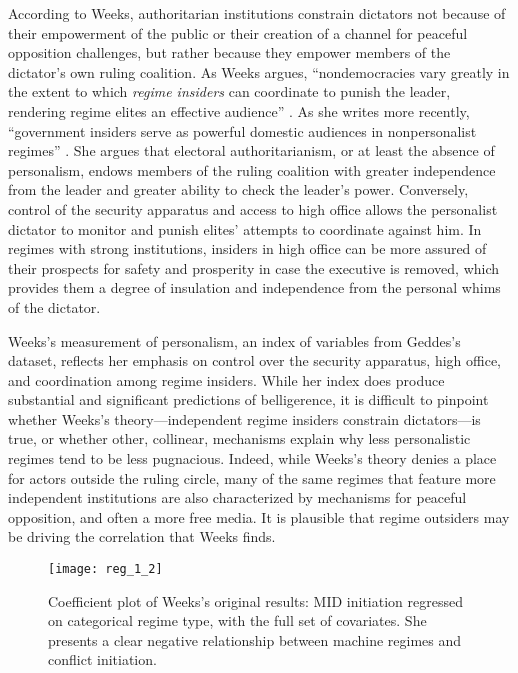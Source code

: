 \documentclass[12pt]{article}
\begin{document}
\par According to Weeks, authoritarian institutions constrain dictators not because of their empowerment of the public or their creation of a channel for peaceful opposition challenges, but rather because they empower members of the dictator's own ruling coalition. As Weeks argues, \enquote{nondemocracies vary greatly in the extent to which \textit{regime insiders} can coordinate to punish the leader, rendering regime elites an effective audience} \parencite*[40, emphasis in original]{weeks:2008}. As she writes more recently, \enquote{government insiders serve as powerful domestic audiences in nonpersonalist regimes} \parencite[330]{weeks:2012}. She argues that electoral authoritarianism, or at least the absence of personalism, endows members of the ruling coalition with greater independence from the leader and greater ability to check the leader's power. Conversely, control of the security apparatus and access to high office allows the personalist dictator to monitor and punish elites' attempts to coordinate against him. In regimes with strong institutions, insiders in high office can be more assured of their prospects for safety and prosperity in case the executive is removed, which provides them a degree of insulation and independence from the personal whims of the dictator.

\par Weeks's measurement of personalism, an index of variables from Geddes's \cite*{geddes:2003} dataset, reflects her emphasis on control over the security apparatus, high office, and coordination among regime insiders. While her index does produce substantial and significant predictions of belligerence, it is difficult to pinpoint whether Weeks's theory---independent regime insiders constrain dictators---is true, or whether other, collinear, mechanisms explain why less personalistic regimes tend to be less pugnacious. Indeed, while Weeks's theory denies a place for actors outside the ruling circle, many of the same regimes that feature more independent institutions are also characterized by mechanisms for peaceful opposition, and often a more free media. It is plausible that regime outsiders may be driving the correlation that Weeks finds.

\begin{figure}
	\texttt{[image: reg\_1\_2]}
	\caption{Coefficient plot of Weeks's original results: MID initiation regressed on categorical regime type, with the full set of covariates. She presents a clear negative relationship between machine regimes and conflict initiation.}
\end{figure}
\end{document}
